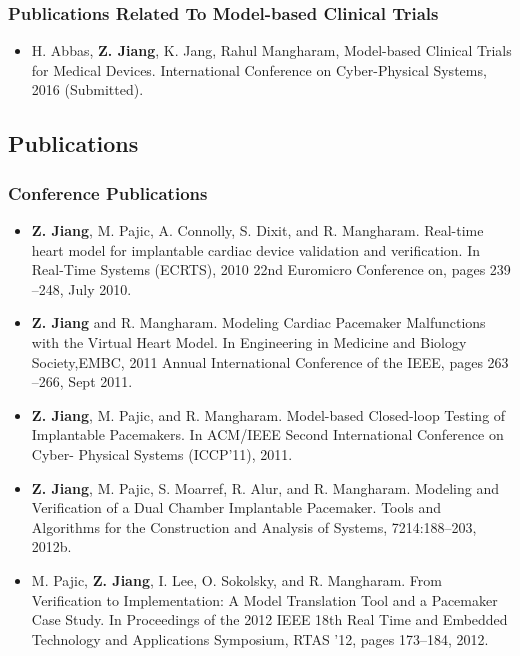\documentclass[a4paper,11pt]{article}
\begin{document}
\subsubsection{Publications Related To Model-based Clinical Trials}
\begin{itemize}
\item H. Abbas, \textbf{Z. Jiang}, K. Jang, Rahul Mangharam, Model-based Clinical Trials for Medical Devices. International Conference on Cyber-Physical Systems, 2016 (Submitted).
\end{itemize}

\subsection{Publications}
\subsubsection{Conference Publications}
\begin{itemize}
\item \textbf{Z. Jiang}, M. Pajic, A. Connolly, S. Dixit, and R. Mangharam. Real-time heart model
for implantable cardiac device validation and verification. In Real-Time Systems
(ECRTS), 2010 22nd Euromicro Conference on, pages 239 –248, July 2010.
\item \textbf{Z. Jiang} and R. Mangharam. Modeling Cardiac Pacemaker Malfunctions with the
Virtual Heart Model. In Engineering in Medicine and Biology Society,EMBC,
2011 Annual International Conference of the IEEE, pages 263 –266, Sept 2011.
\item \textbf{Z. Jiang}, M. Pajic, and R. Mangharam. Model-based Closed-loop Testing of Implantable
Pacemakers. In ACM/IEEE Second International Conference on Cyber-
Physical Systems (ICCP’11), 2011.

\item \textbf{Z. Jiang}, M. Pajic, S. Moarref, R. Alur, and R. Mangharam. Modeling and Verification of a Dual Chamber Implantable Pacemaker. Tools and Algorithms for the
Construction and Analysis of Systems, 7214:188–203, 2012b.
\item M. Pajic, \textbf{Z. Jiang}, I. Lee, O. Sokolsky, and R. Mangharam. From Verification to
Implementation: A Model Translation Tool and a Pacemaker Case Study. In Proceedings
of the 2012 IEEE 18th Real Time and Embedded Technology and Applications
Symposium, RTAS ’12, pages 173–184, 2012.
\end{itemize}
\end{document}
